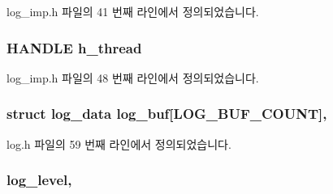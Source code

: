 log\+\_\+imp.\+h 파일의 41 번째 라인에서 정의되었습니다.

\subsubsection[{\texorpdfstring{h\+\_\+thread}{h_thread}}]{\setlength{\rightskip}{0pt plus 5cm}H\+A\+N\+D\+LE h\+\_\+thread\hspace{0.3cm}{\ttfamily [private]}}\hypertarget{classavdecc__lib_1_1log__imp_a38f9e2153b3e3dadac999c7c45549cf6}{}\label{classavdecc__lib_1_1log__imp_a38f9e2153b3e3dadac999c7c45549cf6}


log\+\_\+imp.\+h 파일의 48 번째 라인에서 정의되었습니다.

\subsubsection[{\texorpdfstring{log\+\_\+buf}{log_buf}}]{\setlength{\rightskip}{0pt plus 5cm}struct {\bf log\+\_\+data} log\+\_\+buf\mbox{[}{\bf L\+O\+G\+\_\+\+B\+U\+F\+\_\+\+C\+O\+U\+NT}\mbox{]}\hspace{0.3cm}{\ttfamily [protected]}, {\ttfamily [inherited]}}\hypertarget{classavdecc__lib_1_1log_a2a5ef536ff60c1a9a38f36c0df2f38da}{}\label{classavdecc__lib_1_1log_a2a5ef536ff60c1a9a38f36c0df2f38da}


log.\+h 파일의 59 번째 라인에서 정의되었습니다.

\subsubsection[{\texorpdfstring{log\+\_\+level}{log_level}}]{ log\+\_\+level\hspace{0.3cm}{\ttfamily [protected]}, {\ttfamily [inherited]}}\hypertarget{classavdecc__lib_1_1log_aa07e39131a3e0ab9ffd691b0f455134d}{}\label{classavdecc__lib_1_1log_aa07e39131a3e0ab9ffd691b0f455134d}


